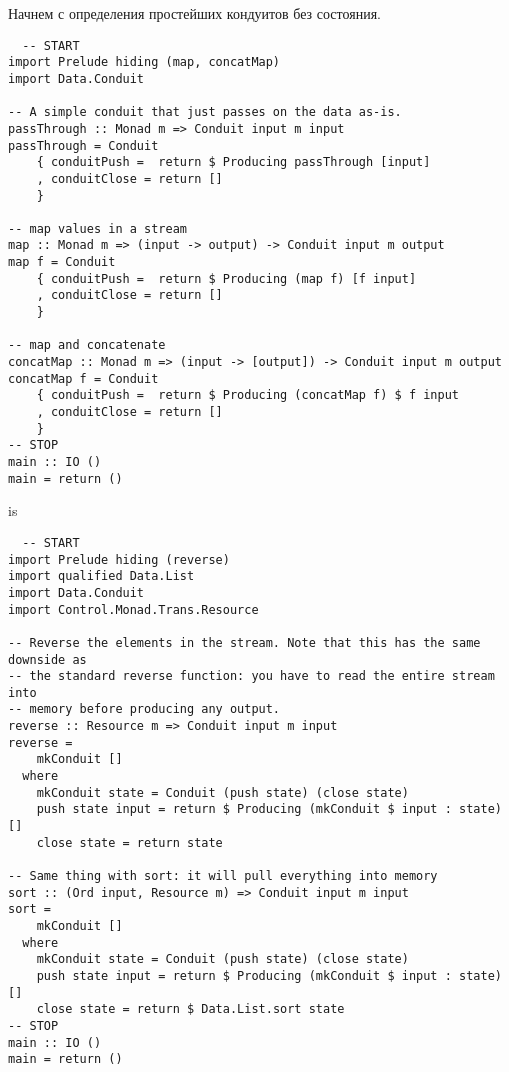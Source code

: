 Начнем с определения простейших кондуитов без состояния.
\begin{lstlisting}
  -- START
import Prelude hiding (map, concatMap)
import Data.Conduit

-- A simple conduit that just passes on the data as-is.
passThrough :: Monad m => Conduit input m input
passThrough = Conduit
    { conduitPush =  return $ Producing passThrough [input]
    , conduitClose = return []
    }

-- map values in a stream
map :: Monad m => (input -> output) -> Conduit input m output
map f = Conduit
    { conduitPush =  return $ Producing (map f) [f input]
    , conduitClose = return []
    }

-- map and concatenate
concatMap :: Monad m => (input -> [output]) -> Conduit input m output
concatMap f = Conduit
    { conduitPush =  return $ Producing (concatMap f) $ f input
    , conduitClose = return []
    }
-- STOP
main :: IO ()
main = return ()
\end{lstlisting}
is
\begin{lstlisting}
  -- START
import Prelude hiding (reverse)
import qualified Data.List
import Data.Conduit
import Control.Monad.Trans.Resource

-- Reverse the elements in the stream. Note that this has the same downside as
-- the standard reverse function: you have to read the entire stream into
-- memory before producing any output.
reverse :: Resource m => Conduit input m input
reverse =
    mkConduit []
  where
    mkConduit state = Conduit (push state) (close state)
    push state input = return $ Producing (mkConduit $ input : state) []
    close state = return state

-- Same thing with sort: it will pull everything into memory
sort :: (Ord input, Resource m) => Conduit input m input
sort =
    mkConduit []
  where
    mkConduit state = Conduit (push state) (close state)
    push state input = return $ Producing (mkConduit $ input : state) []
    close state = return $ Data.List.sort state
-- STOP
main :: IO ()
main = return ()
\end{lstlisting} 
% 
